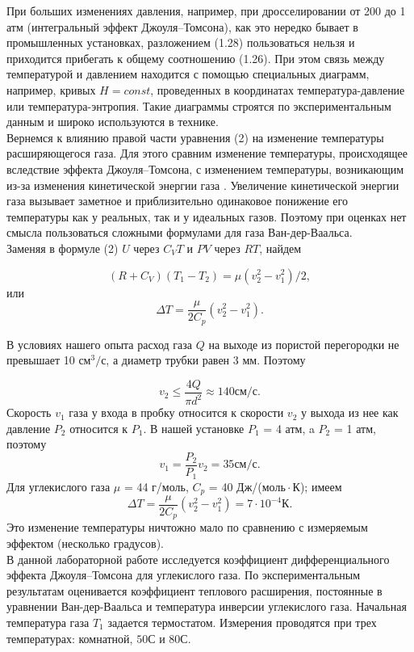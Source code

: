 \documentclass[a4paper, 12pt]{article}%
\begin{document}
	При больших изменениях давления, например, при дросселировании от 200 до 1 атм (интегральный эффект Джоуля–Томсона), как это нередко бывает в промышленных установках, разложением (1.28) пользоваться нельзя и приходится прибегать к общему соотношению (1.26). При этом связь между температурой и давлением находится с помощью специальных диаграмм, например, кривых $H = const$, проведенных в координатах температура-давление или температура-энтропия. Такие диаграммы строятся по экспериментальным данным и широко используются в технике.\\
	
	Вернемся к влиянию правой части уравнения (2) на изменение температуры расширяющегося газа. Для этого сравним изменение температуры, происходящее вследствие эффекта Джоуля–Томсона, с
	изменением температуры, возникающим из-за изменения кинетической энергии газа . Увеличение кинетической энергии газа вызывает заметное и приблизительно одинаковое понижение его температуры как у реальных, так и у идеальных газов. Поэтому при оценках нет смысла пользоваться сложными формулами для газа Ван-дер-Ваальса.\\
	
	Заменяя в формуле (2) $U$ через $C_V T$ и $P V$ через $RT$, найдем
	
	\begin{equation}
		(R+C_V)(T_1 - T_2) = \mu(v_2^2 - v_1^2)/2,
	\end{equation}
	или
	\begin{equation}
		\Delta T = \dfrac{\mu}{2C_p} (v_2^2 - v_1^2).
	\end{equation}
	
	В условиях нашего опыта расход газа $Q$ на выходе из пористой перегородки не превышает 10 $см^3/с$, а диаметр трубки равен 3 мм. Поэтому
	
	\begin{equation}
		v_2 \leqslant \dfrac{4Q}{\pi d^2} \approx 140 см/с.
	\end{equation}
	Скорость $v_1$ газа у входа в пробку относится к скорости $v_2$ у выхода из нее как давление $P_2$ относится к $P_1$. В нашей установке $P_1$ = 4 атм, a $P_2$ = 1 атм, поэтому
	\begin{equation}
		v_1 = \dfrac{P_2}{P_1} v_2 = 35 см/с.
	\end{equation}
	Для углекислого газа $\mu$ = 44 г/моль, $C_p$ = 40 Дж/($моль \cdot К$); имеем
	\begin{equation}
		\Delta T = \dfrac{\mu}{2C_p} (v_2^2 - v_1^2) = 7 \cdot 10^{-4} К.
	\end{equation}
	Это изменение температуры ничтожно мало по сравнению с измеряемым эффектом (несколько градусов).\\
	В данной лабораторной работе исследуется коэффициент дифференциального эффекта Джоуля–Томсона для углекислого газа. По экспериментальным результатам оценивается коэффициент теплового расширения, постоянные в уравнении Ван-дер-Ваальса и температура инверсии углекислого газа. Начальная температура газа $T_1$ задается термостатом. Измерения проводятся при трех температурах: комнатной, $50 С$ и $80 С$.\\
	
\end{document}
